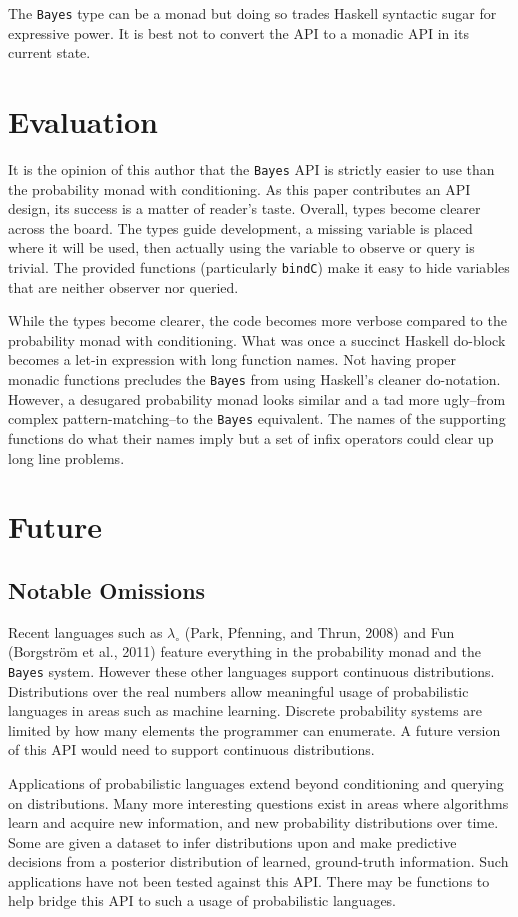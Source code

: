 \documentclass[9pt,twocolumn]{article}
\begin{document}
The \texttt{Bayes} type can be a monad but doing so trades Haskell syntactic sugar for expressive power. It is best not to convert the API to a monadic API in its current state.

\section{Evaluation}
It is the opinion of this author that the \texttt{Bayes} API is strictly easier to use than the probability monad with conditioning. As this paper contributes an API design, its success is a matter of reader's taste. Overall, types become clearer across the board. The types guide development, a missing variable is placed where it will be used, then actually using the variable to observe or query is trivial. The provided functions (particularly \texttt{bindC}) make it easy to hide variables that are neither observer nor queried.

While the types become clearer, the code becomes more verbose compared to the probability monad with conditioning. What was once a succinct Haskell do-block becomes a let-in expression with long function names. Not having proper monadic functions precludes the \texttt{Bayes} from using Haskell's cleaner do-notation. However, a desugared probability monad looks similar and a tad more ugly--from complex pattern-matching--to the \texttt{Bayes} equivalent. The names of the supporting functions do what their names imply but a set of infix operators could clear up long line problems.

\section{Future}
\subsection{Notable Omissions}
Recent languages such as $\lambda_\circ$ (Park, Pfenning, and Thrun, 2008) and Fun (Borgstr\"om et al., 2011) feature everything in the probability monad and the \texttt{Bayes} system. However these other languages support continuous distributions. Distributions over the real numbers allow meaningful usage of probabilistic languages in areas such as machine learning. Discrete probability systems are limited by how many elements the programmer can enumerate. A future version of this API would need to support continuous distributions.

Applications of probabilistic languages extend beyond conditioning and querying on distributions. Many more interesting questions exist in areas where algorithms learn and acquire new information, and new probability distributions over time. Some are given a dataset to infer distributions upon and make predictive decisions from a posterior distribution of learned, ground-truth information. Such applications have not been tested against this API. There may be functions to help bridge this API to such a usage of probabilistic languages.
\end{document}
